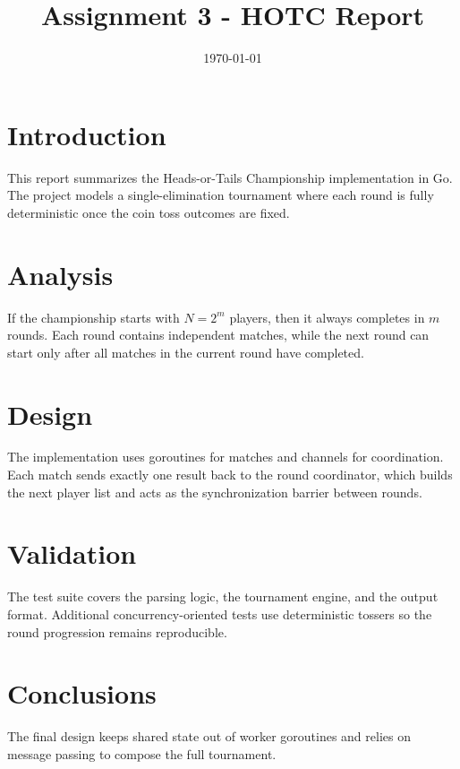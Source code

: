 \documentclass[11pt,a4paper]{article}
\title{Assignment 3 - HOTC Report}
\author{}
\date{\today}
\begin{document}
\maketitle

\section{Introduction}

This report summarizes the Heads-or-Tails Championship implementation in Go.
The project models a single-elimination tournament where each round is fully
deterministic once the coin toss outcomes are fixed.

\section{Analysis}

If the championship starts with $N = 2^m$ players, then it always completes in
$m$ rounds. Each round contains independent matches, while the next round can
start only after all matches in the current round have completed.

\section{Design}

The implementation uses goroutines for matches and channels for coordination.
Each match sends exactly one result back to the round coordinator, which builds
the next player list and acts as the synchronization barrier between rounds.

\section{Validation}

The test suite covers the parsing logic, the tournament engine, and the output
format. Additional concurrency-oriented tests use deterministic tossers so the
round progression remains reproducible.

\section{Conclusions}

The final design keeps shared state out of worker goroutines and relies on
message passing to compose the full tournament.
\end{document}

